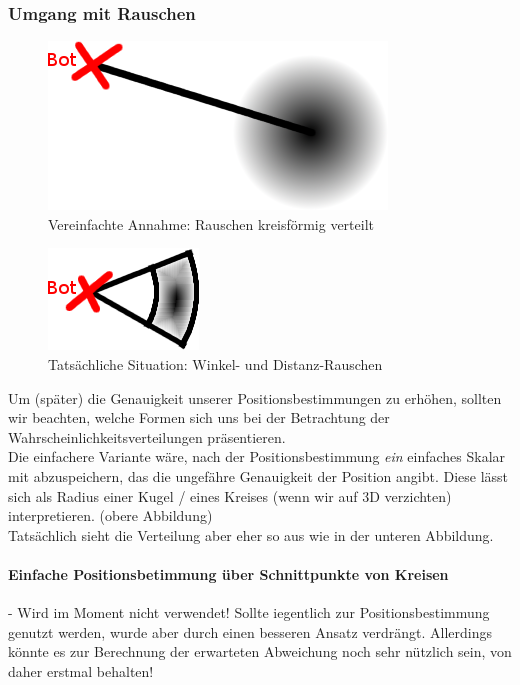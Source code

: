 \subsubsection*{Umgang mit Rauschen}
\begin{figure}[h]
\begin{center}
\includegraphics[scale=0.6]{MPGI3-RC-13S_Wahrscheinlichkeit2}
\end{center}
\caption{Vereinfachte Annahme: Rauschen kreisförmig verteilt}
\end{figure}
\begin{figure}[h]
\begin{center}
\includegraphics[scale=0.6]{MPGI3-RC-13S_Wahrscheinlichkeit1}
\end{center}
\caption{Tatsächliche Situation: Winkel- und Distanz-Rauschen}
\end{figure}
Um (später) die Genauigkeit unserer Positionsbestimmungen zu erhöhen,
 sollten wir beachten, welche Formen sich uns bei der Betrachtung der 
Wahrscheinlichkeitsverteilungen präsentieren.\\
Die einfachere Variante wäre, nach der Positionsbestimmung \textit{ein}
 einfaches Skalar mit abzuspeichern, das die ungefähre Genauigkeit der 
Position angibt. Diese lässt sich als Radius einer Kugel / eines Kreises
 (wenn wir auf 3D verzichten) interpretieren. (obere Abbildung)\\
Tatsächlich sieht die Verteilung aber eher so aus wie in der unteren Abbildung.

\paragraph*{Einfache Positionsbetimmung über Schnittpunkte von Kreisen}
- Wird im Moment nicht verwendet! Sollte iegentlich zur 
Positionsbestimmung genutzt werden, wurde aber durch einen besseren 
Ansatz verdrängt.
Allerdings könnte es zur Berechnung der erwarteten Abweichung noch sehr 
nützlich sein, von daher erstmal behalten!

